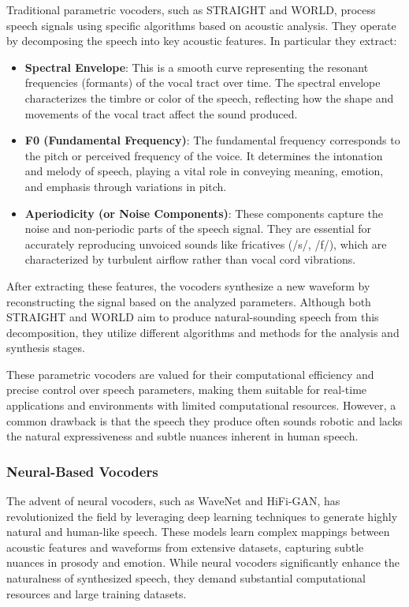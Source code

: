 \documentclass[12pt]{article}
\begin{document}
Traditional parametric vocoders, such as STRAIGHT and WORLD, process speech signals using specific algorithms based on acoustic analysis. They operate by decomposing the speech into key acoustic features. In particular they extract:

\begin{itemize}
    \item \textbf{Spectral Envelope}: This is a smooth curve representing the resonant frequencies (formants) of the vocal tract over time. The spectral envelope characterizes the timbre or color of the speech, reflecting how the shape and movements of the vocal tract affect the sound produced.
    
    \item \textbf{F0 (Fundamental Frequency)}: The fundamental frequency corresponds to the pitch or perceived frequency of the voice. It determines the intonation and melody of speech, playing a vital role in conveying meaning, emotion, and emphasis through variations in pitch.
    
    \item \textbf{Aperiodicity (or Noise Components)}: These components capture the noise and non-periodic parts of the speech signal. They are essential for accurately reproducing unvoiced sounds like fricatives (/s/, /f/), which are characterized by turbulent airflow rather than vocal cord vibrations.
\end{itemize}

After extracting these features, the vocoders synthesize a new waveform by reconstructing the signal based on the analyzed parameters. Although both STRAIGHT and WORLD aim to produce natural-sounding speech from this decomposition, they utilize different algorithms and methods for the analysis and synthesis stages.

These parametric vocoders are valued for their computational efficiency and precise control over speech parameters, making them suitable for real-time applications and environments with limited computational resources. However, a common drawback is that the speech they produce often sounds robotic and lacks the natural expressiveness and subtle nuances inherent in human speech.

\subsubsection{Neural-Based Vocoders}

The advent of neural vocoders, such as WaveNet and HiFi-GAN, has revolutionized the field by leveraging deep learning techniques to generate highly natural and human-like speech. These models learn complex mappings between acoustic features and waveforms from extensive datasets, capturing subtle nuances in prosody and emotion. While neural vocoders significantly enhance the naturalness of synthesized speech, they demand substantial computational resources and large training datasets.
\end{document}
